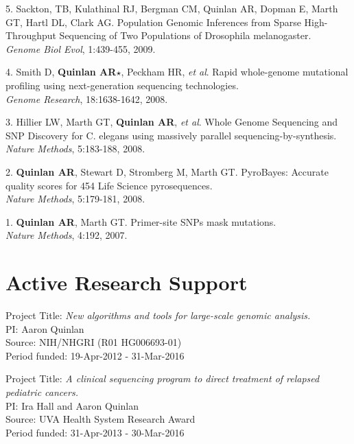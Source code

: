 \documentclass[margin,line]{cv}
\begin{document}
\begin{resume}
\begin{list}{*}{}
    \item[5.] Sackton, TB, Kulathinal RJ, Bergman CM, Quinlan AR, Dopman E, Marth GT, Hartl DL, Clark AG. 
    Population Genomic Inferences from Sparse High-Throughput Sequencing of Two Populations of Drosophila melanogaster.\\
    \textit{Genome Biol Evol}, 1:439-455, 2009.

    \item[4.] Smith D, \textbf{Quinlan AR}$\star$, Peckham HR, \textit{et al}. 
    Rapid whole-genome mutational profiling using next-generation sequencing technologies.\\
    \textit{Genome Research}, 18:1638-1642, 2008.

    \item[3.] Hillier LW, Marth GT, \textbf{Quinlan AR}, \textit{et al}. 
    Whole Genome Sequencing and SNP Discovery for C. elegans using massively parallel sequencing-by-synthesis.\\
    \textit{Nature Methods}, 5:183-188, 2008.
    
    \item[2.] \textbf{Quinlan AR}, Stewart D, Stromberg M, Marth GT. 
    PyroBayes: Accurate quality scores for 454 Life Science pyrosequences.\\
    \textit{Nature Methods}, 5:179-181, 2008.
    
    \item[1.] \textbf{Quinlan AR}, Marth GT. 
    Primer-site SNPs mask mutations.\\
    \textit{Nature Methods}, 4:192, 2007.

    \end{list}
    

    \section{\mysidestyle Active Research Support}

    Project Title: \textit{New algorithms and tools for large-scale genomic analysis.} \\
    PI: Aaron Quinlan \\
    Source: NIH/NHGRI (R01 HG006693-01) \\
    Period funded: 19-Apr-2012 - 31-Mar-2016
    
    Project Title: \textit{A clinical sequencing program to direct treatment of relapsed pediatric cancers.} \\
    PI: Ira Hall and Aaron Quinlan \\
    Source: UVA Health System Research Award  \\
    Period funded: 31-Apr-2013 - 30-Mar-2016


\end{resume}
\end{document}
